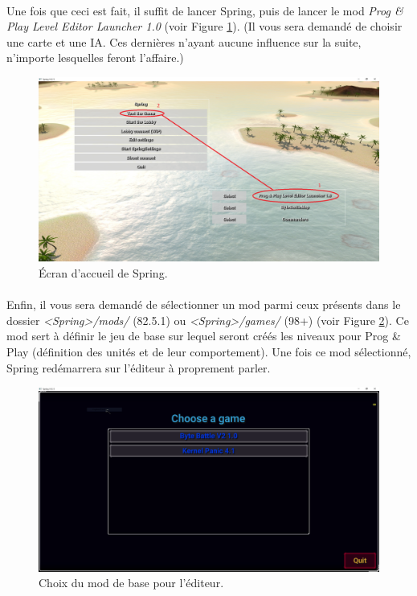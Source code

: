 \documentclass[a4paper]{article}
\begin{document}
\paragraph{ }
Une fois que ceci est fait, il suffit de lancer Spring, puis de lancer le mod \textit{Prog \& Play Level Editor Launcher 1.0} (voir Figure \ref{fig:editor-spring-launcher}). (Il vous sera demandé de choisir une carte et une IA. Ces dernières n'ayant aucune influence sur la suite, n'importe lesquelles feront l'affaire.)
\begin{figure}[H]
\centering
\includegraphics[width=\linewidth]{editor-spring-launcher.png}
\caption{Écran d'accueil de Spring.}
\label{fig:editor-spring-launcher}
\end{figure}
\paragraph{ }
Enfin, il vous sera demandé de sélectionner un mod parmi ceux présents dans le dossier \textit{<Spring>/mods/} (82.5.1) ou \textit{<Spring>/games/} (98+) (voir Figure \ref{fig:pre-launcher}). Ce mod sert à définir le jeu de base sur lequel seront créés les niveaux pour Prog \& Play (définition des unités et de leur comportement). Une fois ce mod sélectionné, Spring redémarrera sur l'éditeur à proprement parler.
\begin{figure}[H]
\centering
\includegraphics[width=\linewidth]{pre-launcher.png}
\caption{Choix du mod de base pour l'éditeur.}
\label{fig:pre-launcher}
\end{figure}
\end{document}
